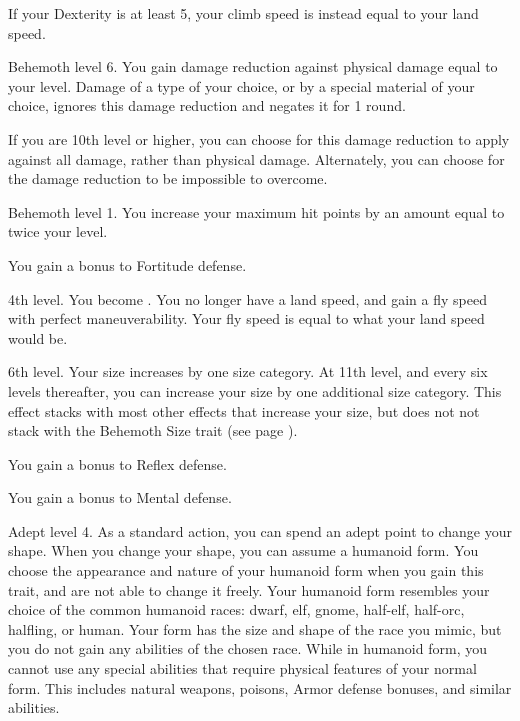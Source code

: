     If your Dexterity is at least 5, your climb speed is instead equal to your land speed.

    \featpre Behemoth level 6.
    \featben You gain damage reduction against physical damage equal to your level.
    Damage of a type of your choice, or by a special material of your choice, ignores this damage reduction and negates it for 1 round.

    If you are 10th level or higher, you can choose for this damage reduction to apply against all damage, rather than physical damage.
    Alternately, you can choose for the damage reduction to be impossible to overcome.

    \featpre Behemoth level 1.
    \featben You increase your maximum hit points by an amount equal to twice your level.

    \featben You gain a  bonus to Fortitude defense.

    \featpre 4th level.
    \featben You become .
    You no longer have a land speed, and gain a fly speed with perfect maneuverability.
    Your fly speed is equal to what your land speed would be.

    \featpre 6th level.
    \featben Your size increases by one size category.
    At 11th level, and every six levels thereafter, you can increase your size by one additional size category.
    This effect stacks with most other effects that increase your size, but does not not stack with the Behemoth Size trait (see page ).

    \featben You gain a  bonus to Reflex defense.

    \featben You gain a  bonus to Mental defense.

    \featpre Adept level 4.
    \featben As a standard action, you can spend an adept point to change your shape.
    When you change your shape, you can assume a humanoid form.
    You choose the appearance and nature of your humanoid form when you gain this trait, and are not able to change it freely.
    Your humanoid form resembles your choice of the common humanoid races: dwarf, elf, gnome, half-elf, half-orc, halfling, or human.
    Your form has the size and shape of the race you mimic, but you do not gain any abilities of the chosen race.
    While in humanoid form, you cannot use any special abilities that require physical features of your normal form.
    This includes natural weapons, poisons, Armor defense bonuses, and similar abilities.

